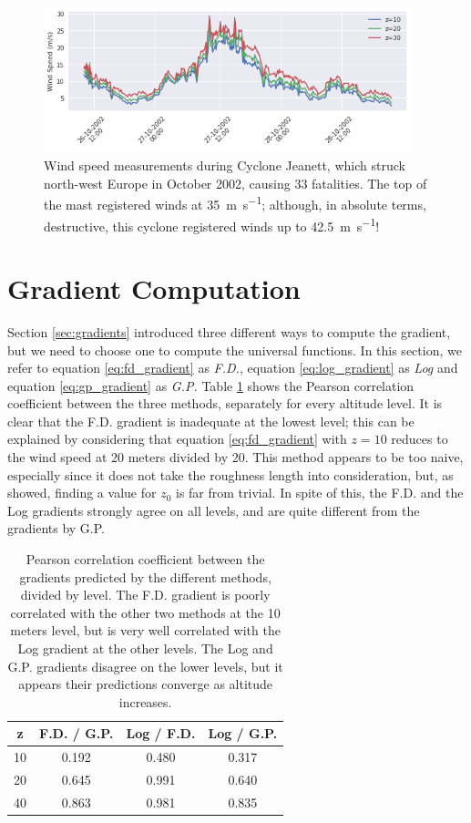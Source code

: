 \documentclass[a4paper]{book}
\begin{document}
\begin{figure}
    \centering
	\includegraphics[width=0.95\textwidth]{images/cyclone_jeanett}
	\caption{Wind speed measurements during Cyclone Jeanett, which struck north-west Europe in October 2002, causing 33 fatalities. The top of the mast registered winds at \SI{35}{\meter\per\second}; although, in absolute terms, destructive, this cyclone registered winds up to \SI{42.5}{\meter\per\second}!}
	\label{fig:cyclone_jeanett}
\end{figure}



\section{Gradient Computation}
Section \ref{sec:gradients} introduced three different ways to compute the gradient, but we need to choose one to compute the universal functions. In this section, we refer to equation \ref{eq:fd_gradient} as \emph{F.D.}, equation \ref{eq:log_gradient} as \emph{Log} and equation \ref{eq:gp_gradient} as \emph{G.P.} Table \ref{tbl:gradients_corr} shows the Pearson correlation coefficient between the three methods, separately for every altitude level. It is clear that the F.D. gradient is inadequate at the lowest level; this can be explained by considering that equation \ref{eq:fd_gradient} with $z=10$ reduces to the wind speed at 20 meters divided by 20. This method appears to be too naive, especially since it does not take the roughness length into consideration, but, as \cite{cabauw_z0} showed, finding a value for $z_0$ is far from trivial. In spite of this, the F.D. and the Log gradients strongly agree on all levels, and are quite different from the gradients by G.P.

\begin{table}[]
\centering
\caption{Pearson correlation coefficient between the gradients predicted by the different methods, divided by level. The F.D. gradient is poorly correlated with the other two methods at the 10 meters level, but is very well correlated with the Log gradient at the other levels. The Log and G.P. gradients disagree on the lower levels, but it appears their predictions converge as altitude increases.}
\label{tbl:gradients_corr}
\begin{tabular}{c|c|c|c}
\toprule
z & F.D. / G.P. & Log / F.D. & Log / G.P. \\ \midrule
 	10 & 	0.192 & 0.480 &	0.317 \\
 	20 &	0.645 	& 0.991 &	0.640 \\
 	40 &	0.863 & 0.981 &	0.835 \\
\bottomrule
\end{tabular}
\end{table}
\end{document}
